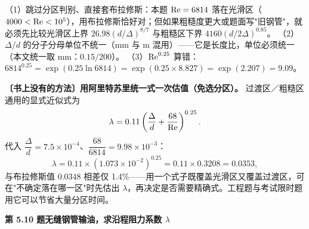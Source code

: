 \begin{yicuo}
（1）跳过分区判别、直接套布拉修斯：本题 $\mathrm{Re}=6814$ 落在光滑区（$4000<\mathrm{Re}<10^5$），用布拉修斯恰好对；但如果粗糙度更大或题面写"旧钢管"，就必须先比较光滑区上界 $26.98(d/\Delta)^{8/7}$ 与粗糙区下界 $4160(d/2\Delta)^{0.85}$。
（2）$\Delta/d$ 的分子分母单位不统一（$\mathrm{mm}$ 与 $\mathrm{m}$ 混用）——它是长度比，单位必须统一（本文统一取 $\mathrm{mm}$：$0.15/200$）。
（3）$\mathrm{Re}^{0.25}$ 算错：$6814^{0.25}=\exp(0.25\ln6814)=\exp(0.25\times8.827)=\exp(2.207)=9.09$。
\end{yicuo}
\begin{banfa}
\textbf{〔书上没有的方法〕用阿里特苏里统一式一次估值（免选分区）。} 过渡区／粗糙区通用的显式近似式为
\[\lambda=0.11\left(\frac{\Delta}{d}+\frac{68}{\mathrm{Re}}\right)^{0.25}.\]
代入 $\dfrac{\Delta}{d}=7.5\times10^{-4}$、$\dfrac{68}{6814}=9.98\times10^{-3}$：
\[\lambda=0.11\times\left(1.073\times10^{-2}\right)^{0.25}=0.11\times0.3208=0.0353,\]
与布拉修斯值 $0.0348$ 相差仅 1.4\%——用一个式子既覆盖光滑区又覆盖过渡区，可在"不确定落在哪一区"时先估出 $\lambda$，再决定是否需要精确式。工程题与考试限时题用它可以节省大量分区时间。
\end{banfa}

\noindent\textbf{第 5.10 题\quad 无缝钢管输油，求沿程阻力系数 $\lambda$}

